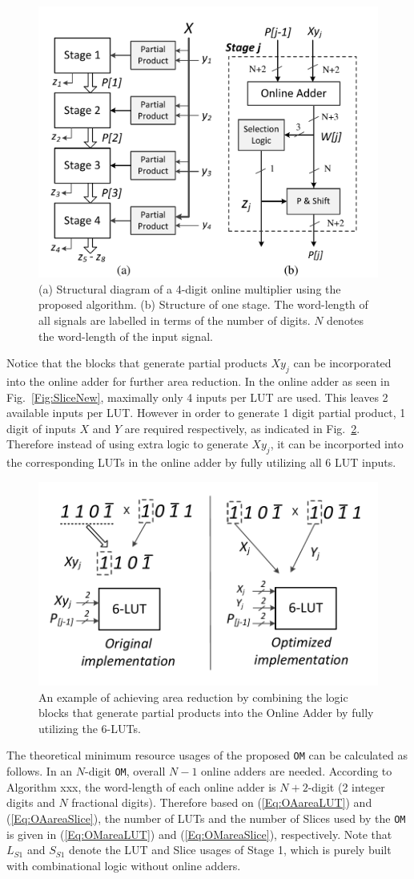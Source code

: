 \documentclass[conference]{IEEEtran}
\begin{document}
\begin{figure}[tbp]
	\centering
	\includegraphics[width=.5\textwidth]{./Figures/ParallelMult_Structure.pdf}
	\caption{(a) Structural diagram of a 4-digit online multiplier using the proposed algorithm. (b) Structure of one stage. The word-length of all signals are labelled in terms of the number of digits. $N$ denotes the word-length of the input signal.}
	\label{Fig:PMStructure}
\end{figure}

Notice that the blocks that generate partial products $Xy_j$ can be incorporated into the online adder for further area reduction. In the online adder as seen in Fig.~\ref{Fig:SliceNew}, maximally only 4 inputs per LUT are used. This leaves 2 available inputs per LUT. However in order to generate 1 digit partial product, 1 digit of inputs $X$ and $Y$ are required respectively, as indicated in Fig.~\ref{Fig:PartialProduct}. Therefore instead of using extra logic to generate $Xy_j$, it can be incorported into the corresponding LUTs in the online adder by fully utilizing all 6 LUT inputs.

\begin{figure}[tbp]
	\centering
	\includegraphics[width=.4\textwidth]{./Figures/PartialProduct.pdf}
	\caption{An example of achieving area reduction by combining the logic blocks that generate partial products into the Online Adder by fully utilizing the 6-LUTs.}
	\label{Fig:PartialProduct}
\end{figure}

The theoretical minimum resource usages of the proposed \texttt{OM} can be calculated as follows. In an $N$-digit \texttt{OM}, overall $N-1$ online adders are needed. According to Algorithm xxx, the word-length of each online adder is $N+2$-digit (2 integer digits and $N$ fractional digits). Therefore based on (\ref{Eq:OAareaLUT}) and (\ref{Eq:OAareaSlice}), the number of LUTs and the number of Slices used by the \texttt{OM} is given in (\ref{Eq:OMareaLUT}) and (\ref{Eq:OMareaSlice}), respectively. Note that $L_{S1}$ and $S_{S1}$ denote the LUT and Slice usages of Stage 1, which is purely built with combinational logic without online adders.
\end{document}
